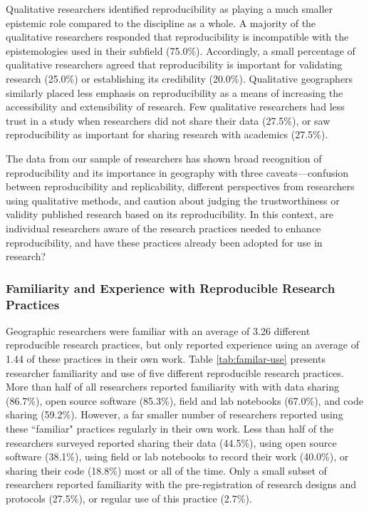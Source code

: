 \documentclass[]{interact}
\theoremstyle{plain}%
\theoremstyle{definition}
\theoremstyle{remark}
\begin{document}
Qualitative researchers identified reproducibility as playing a much smaller epistemic role compared to the discipline as a whole. 
A majority of the qualitative researchers responded that reproducibility is incompatible with the epistemologies used in their subfield (75.0\%).
Accordingly, a small percentage of qualitative researchers agreed that reproducibility is important for validating research (25.0\%) or establishing its credibility (20.0\%).
Qualitative geographers similarly placed less emphasis on reproducibility as a means of increasing the accessibility and extensibility of research.
Few qualitative researchers had less trust in a study when researchers did not share their data (27.5\%), or saw reproducibility as important for sharing research with academics (27.5\%).

The data from our sample of researchers has shown broad recognition of reproducibility and its importance in geography with three caveats---confusion between reproducibility and replicability, different perspectives from researchers using qualitative methods, and caution about judging the trustworthiness or validity published research based on its reproducibility. 
In this context, are individual researchers aware of the research practices needed to enhance reproducibility, and have these practices already been adopted for use in research?

\subsubsection*{Familiarity and Experience with Reproducible Research Practices}
Geographic researchers were familiar with an average of 3.26 different reproducible research practices, but only reported experience using an average of 1.44 of these practices in their own work.
Table \ref{tab:familar-use} presents researcher familiarity and use of five different reproducible research practices.
More than half of all researchers reported familiarity with with data sharing (86.7\%), open source software (85.3\%), field and lab notebooks (67.0\%), and code sharing (59.2\%).
However, a far smaller number of researchers reported using these ``familiar" practices regularly in their own work. 
Less than half of the researchers surveyed reported sharing their data (44.5\%), using open source software (38.1\%), using field or lab notebooks to record their work (40.0\%), or sharing their code (18.8\%) most or all of the time. 
Only a small subset of researchers reported familiarity with the pre-registration of research designs and protocols (27.5\%), or regular use of this practice (2.7\%).
\end{document}
